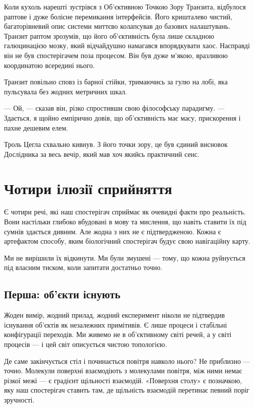\documentclass[12pt, a4paper, openany]{book}
\begin{document}
\begin{terrybox}
Коли кухоль нарешті зустрівся з Об'єктивною Точкою Зору Транзита, відбулося раптове і дуже болісне перемикання інтерфейсів. Його кришталево чистий, багаторівневий опис системи миттєво колапсував до базових налаштувань. Транзит раптом зрозумів, що його об'єктивність була лише складною галюцинацією мозку, який відчайдушно намагався впорядкувати хаос. Насправді він не був спостерігачем поза процесом. Він був дуже м'якою, вразливою координатою всередині нього.

Транзит повільно сповз із барної стійки, тримаючись за гулю на лобі, яка пульсувала без жодних метричних шкал.

\medskip
--- Ой, --- сказав він, різко спростивши свою філософську парадигму. --- Здається, я щойно емпірично довів, що об'єктивність має масу, прискорення і пахне дешевим елем.

\medskip
Троль Цегла схвально кивнув. З його точки зору, це був єдиний висновок Дослідника за весь вечір, який мав хоч якийсь практичний сенс.
\end{terrybox}

\chapter{Чотири ілюзії сприйняття}

Є чотири речі, які наш спостерігач сприймає як очевидні факти про реальність. Вони настільки глибоко вбудовані в мову та мислення, що навіть ставити їх під сумнів здається дивним. Але жодна з них не є підтвердженою. Кожна є артефактом способу, яким біологічний спостерігач будує свою навігаційну карту.

Ми не вирішили їх відкинути. Ми були змушені --- тому, що кожна руйнується під власним тиском, коли запитати достатньо точно.

\section{Перша: об'єкти існують}

Жоден вимір, жодний прилад, жодний експеримент ніколи не підтвердив існування об'єктів як незалежних примітивів. Є лише процеси і стабільні конфігурації переходів. Ми живемо не в об'єктивному світі речей, а у світі процесів — і цей світ описується чистою топологією.

Де саме закінчується стіл і починається повітря навколо нього? Не приблизно — точно. Молекули поверхні взаємодіють з молекулами повітря, між ними немає різкої межі — є градієнт щільності взаємодій. «Поверхня столу» є позначкою, яку наш спостерігач ставить там, де щільність взаємодій перетинає певний поріг зручності.
\end{document}
